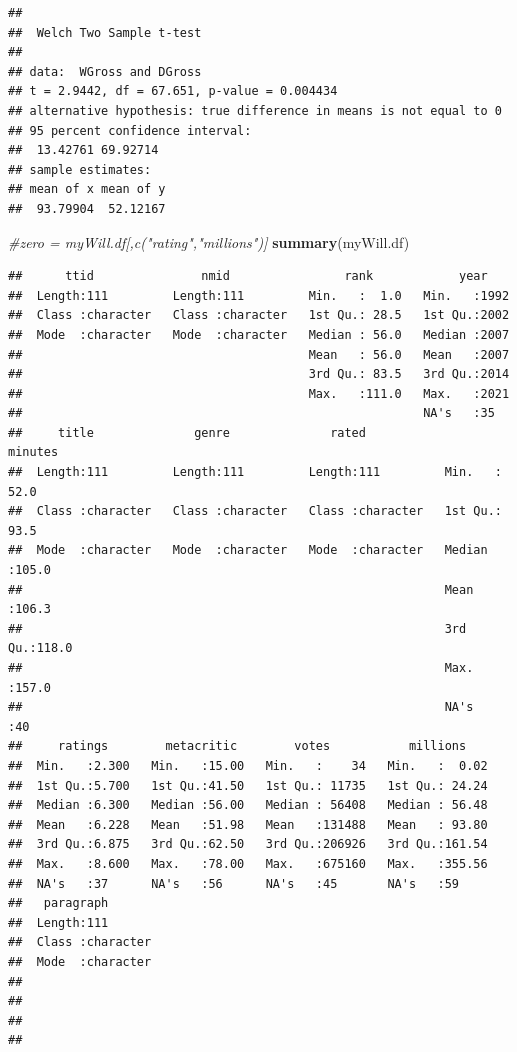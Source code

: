 \documentclass[]{article}
\newenvironment{Shaded}{\begin{snugshade}}{\end{snugshade}}
\newcommand{\CommentTok}[1]{\textcolor[rgb]{0.56,0.35,0.01}{\textit{#1}}}
\newcommand{\KeywordTok}[1]{\textcolor[rgb]{0.13,0.29,0.53}{\textbf{#1}}}
\newcommand{\NormalTok}[1]{#1}
\begin{document}
\begin{verbatim}
## 
##  Welch Two Sample t-test
## 
## data:  WGross and DGross
## t = 2.9442, df = 67.651, p-value = 0.004434
## alternative hypothesis: true difference in means is not equal to 0
## 95 percent confidence interval:
##  13.42761 69.92714
## sample estimates:
## mean of x mean of y 
##  93.79904  52.12167
\end{verbatim}

\begin{Shaded}
\begin{Highlighting}[]
\CommentTok{\#zero = myWill.df[,c("rating","millions")]}
\KeywordTok{summary}\NormalTok{(myWill.df)}
\end{Highlighting}
\end{Shaded}

\begin{verbatim}
##      ttid               nmid                rank            year     
##  Length:111         Length:111         Min.   :  1.0   Min.   :1992  
##  Class :character   Class :character   1st Qu.: 28.5   1st Qu.:2002  
##  Mode  :character   Mode  :character   Median : 56.0   Median :2007  
##                                        Mean   : 56.0   Mean   :2007  
##                                        3rd Qu.: 83.5   3rd Qu.:2014  
##                                        Max.   :111.0   Max.   :2021  
##                                                        NA's   :35    
##     title              genre              rated              minutes     
##  Length:111         Length:111         Length:111         Min.   : 52.0  
##  Class :character   Class :character   Class :character   1st Qu.: 93.5  
##  Mode  :character   Mode  :character   Mode  :character   Median :105.0  
##                                                           Mean   :106.3  
##                                                           3rd Qu.:118.0  
##                                                           Max.   :157.0  
##                                                           NA's   :40     
##     ratings        metacritic        votes           millions     
##  Min.   :2.300   Min.   :15.00   Min.   :    34   Min.   :  0.02  
##  1st Qu.:5.700   1st Qu.:41.50   1st Qu.: 11735   1st Qu.: 24.24  
##  Median :6.300   Median :56.00   Median : 56408   Median : 56.48  
##  Mean   :6.228   Mean   :51.98   Mean   :131488   Mean   : 93.80  
##  3rd Qu.:6.875   3rd Qu.:62.50   3rd Qu.:206926   3rd Qu.:161.54  
##  Max.   :8.600   Max.   :78.00   Max.   :675160   Max.   :355.56  
##  NA's   :37      NA's   :56      NA's   :45       NA's   :59      
##   paragraph        
##  Length:111        
##  Class :character  
##  Mode  :character  
##                    
##                    
##                    
## 
\end{verbatim}
\end{document}

